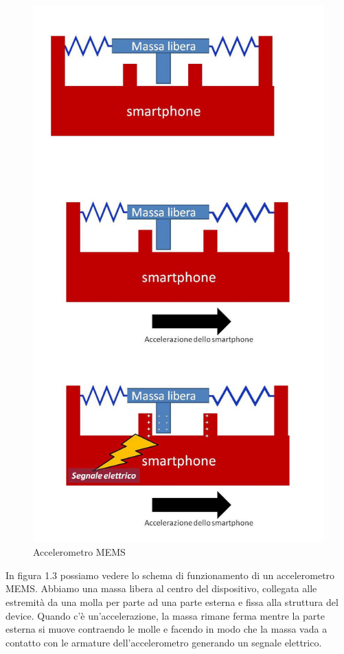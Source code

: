 \documentclass[12pt,a4paper,openright,twoside]{report}
\begin{document}
\begin{figure}[h!]
\centering 
\includegraphics[scale=0.2]{fig4} 
\caption{Accelerometro MEMS} 
\end{figure}
In figura 1.3 possiamo vedere lo schema di funzionamento di un accelerometro MEMS. Abbiamo una massa libera al centro del dispositivo, collegata alle estremità da una molla per parte ad una parte esterna e fissa alla struttura del device. Quando c'è un'accelerazione, la massa rimane ferma mentre la parte esterna si muove contraendo le molle e facendo in modo che la massa vada a contatto con le armature dell'accelerometro generando un segnale elettrico. 
\end{document}
